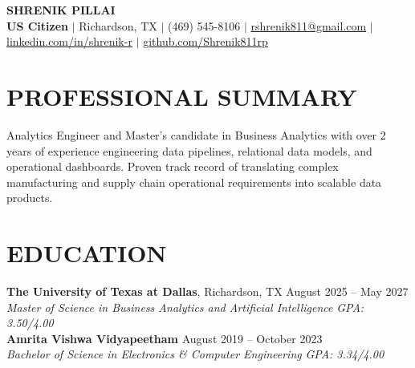 \documentclass[11pt,letterpaper]{article}
\begin{document}
\begin{center}
{\LARGE \textbf{SHRENIK PILLAI}} \\ \vspace{2pt}
\textbf{US Citizen} $|$ \small Richardson, TX $|$ (469) 545-8106 $|$ \href{mailto:rshrenik811@gmail.com}{rshrenik811@gmail.com} $|$ \href{https://linkedin.com/in/shrenik-r}{linkedin.com/in/shrenik-r} $|$ \href{https://github.com/Shrenik811rp}{github.com/Shrenik811rp}
\end{center}
\section*{PROFESSIONAL SUMMARY}
\noindent\small Analytics Engineer and Master's candidate in Business Analytics with over 2 years of experience engineering data pipelines, relational data models, and operational dashboards. Proven track record of translating complex manufacturing and supply chain operational requirements into scalable data products.
\section*{EDUCATION}
\noindent\small \textbf{The University of Texas at Dallas}, Richardson, TX \hfill August 2025 -- May 2027 \\
\textit{Master of Science in Business Analytics and Artificial Intelligence} \hfill \textit{GPA: 3.50/4.00} \\
\noindent\small \textbf{Amrita Vishwa Vidyapeetham} \hfill August 2019 -- October 2023 \\
\textit{Bachelor of Science in Electronics \& Computer Engineering} \hfill \textit{GPA: 3.34/4.00}
\end{document}
